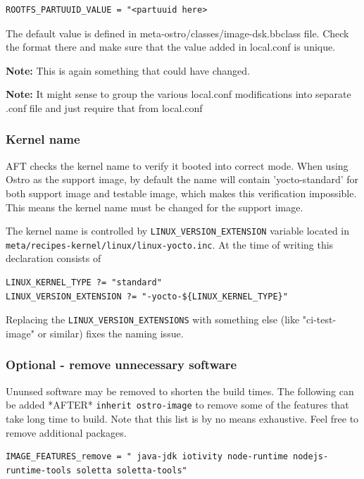 \documentclass[a4paper,11pt]{article}
\newcommand{\note}{\textbf{Note: }}
\newcommand{\cmd}[1]{\texttt{#1}}
\begin{document}
\begin{lstlisting}
ROOTFS_PARTUUID_VALUE = "<partuuid here>
\end{lstlisting}

The default value is defined in meta-ostro/classes/image-dsk.bbclass file. Check the format there and make sure that the value added in local.conf is unique.


\note This is again something that could have changed.

\note It might sense to group the various local.conf modifications into separate .conf file and just require that from local.conf

\subsubsection*{Kernel name}

AFT checks the kernel name to verify it booted into correct mode. When using Ostro as the support image, by default the name will contain 'yocto-standard' for both support image and testable image, which makes this verification impossible. This means the kernel name must be changed for the support image.

The kernel name is controlled by \cmd{LINUX\_VERSION\_EXTENSION} variable located in \cmd{meta/recipes-kernel/linux/linux-yocto.inc}. At the time of writing this declaration consists of

\begin{lstlisting}
LINUX_KERNEL_TYPE ?= "standard"
LINUX_VERSION_EXTENSION ?= "-yocto-${LINUX_KERNEL_TYPE}"
\end{lstlisting}

Replacing the \cmd{LINUX\_VERSION\_EXTENSIONS} with something else (like "ci-test-image" or similar) fixes the naming issue.


\subsubsection*{Optional - remove unnecessary software}

Ununsed software may be removed to shorten the build times. The following can be added *AFTER* \cmd{inherit ostro-image} to remove some of the features that take long time to build. Note that this list is by no means exhaustive. Feel free to remove additional packages.

\begin{lstlisting}
IMAGE_FEATURES_remove = " java-jdk iotivity node-runtime nodejs-runtime-tools soletta soletta-tools"
\end{lstlisting}
\end{document}
